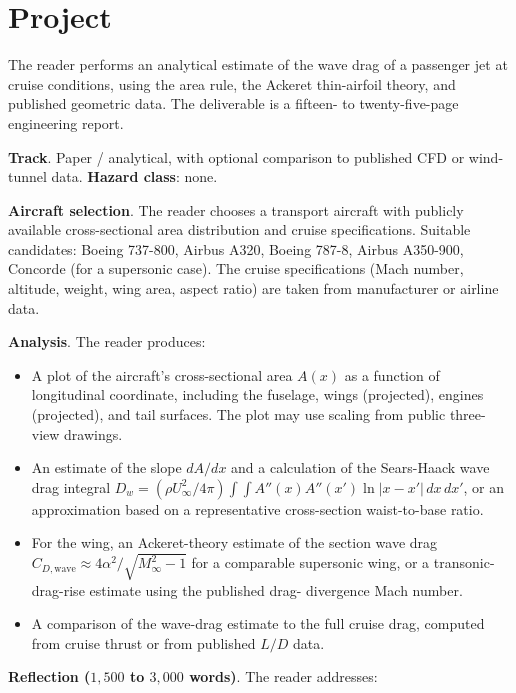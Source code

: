 \section{Project}

\begin{project}
The reader performs an analytical estimate of the wave drag of a
passenger jet at cruise conditions, using the area rule, the
Ackeret thin-airfoil theory, and published geometric data. The
deliverable is a fifteen- to twenty-five-page engineering report.

\textbf{Track}. Paper / analytical, with optional comparison to
published CFD or wind-tunnel data. \textbf{Hazard class}: none.

\textbf{Aircraft selection}. The reader chooses a transport
aircraft with publicly available cross-sectional area distribution
and cruise specifications. Suitable candidates: Boeing 737-800,
Airbus A320, Boeing 787-8, Airbus A350-900, Concorde (for a
supersonic case). The cruise specifications (Mach number,
altitude, weight, wing area, aspect ratio) are taken from
manufacturer or airline data.

\textbf{Analysis}. The reader produces:

\begin{itemize}[leftmargin=*]
  \item A plot of the aircraft's cross-sectional area $A(x)$ as a
    function of longitudinal coordinate, including the fuselage,
    wings (projected), engines (projected), and tail surfaces. The
    plot may use scaling from public three-view drawings.
  \item An estimate of the slope $dA/dx$ and a calculation of the
    Sears-Haack wave drag integral $D_w = (\rho U_\infty^2/4\pi)
    \int\int A''(x) A''(x') \ln|x - x'| \,dx \,dx'$, or an
    approximation based on a representative cross-section
    waist-to-base ratio.
  \item For the wing, an Ackeret-theory estimate of the
    section wave drag $C_{D,\text{wave}} \approx 4\alpha^2/
    \sqrt{M_\infty^2 - 1}$ for a comparable supersonic wing, or
    a transonic-drag-rise estimate using the published drag-
    divergence Mach number.
  \item A comparison of the wave-drag estimate to the full cruise
    drag, computed from cruise thrust or from published $L/D$
    data.
\end{itemize}

\textbf{Reflection ($1{,}500$ to $3{,}000$ words)}. The reader
addresses:


\end{project}
